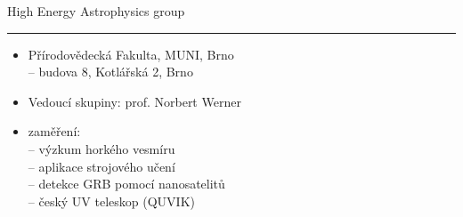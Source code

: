 \documentclass[aspectratio=43]{beamer}
\begin{document}
\begin{frame}{\vspace{-2mm}High Energy Astrophysics group\phantom{j$^1$}\\\vspace{1.5mm}\hrule}
\vspace{8mm}
\begin{itemize}
    \item<2-8> Přírodovědecká Fakulta, MUNI, Brno\\ \vspace{3mm}
        -- budova 8, Kotlářská 2, Brno\\ \vspace{5mm}
    \item<3-8> Vedoucí skupiny: prof. Norbert Werner\\ \vspace{5mm}
    \item<4-8> zaměření:\\ \vspace{3mm}
        -- výzkum horkého vesmíru\\ \vspace{3mm}
        -- aplikace strojového učení\\ \vspace{3mm}
        -- detekce GRB pomocí nanosatelitů\\ \vspace{3mm}
        -- český UV teleskop (QUVIK)\\
\end{itemize}
\end{frame}
\end{document}
